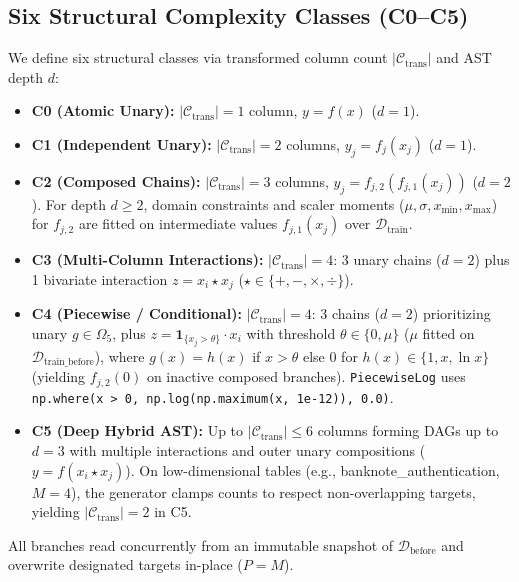 \documentclass[sigconf]{acmart}
\begin{document}
\subsection{Six Structural Complexity Classes (C0--C5)}
We define six structural classes via transformed column count $|\mathcal{C}_{\text{trans}}|$ and AST depth $d$:
\begin{itemize}
    \item \textbf{C0 (Atomic Unary):} $|\mathcal{C}_{\text{trans}}|=1$ column, $y=f(x)$ ($d=1$).
    \item \textbf{C1 (Independent Unary):} $|\mathcal{C}_{\text{trans}}|=2$ columns, $y_j=f_j(x_j)$ ($d=1$).
    \item \textbf{C2 (Composed Chains):} $|\mathcal{C}_{\text{trans}}|=3$ columns, $y_j=f_{j,2}(f_{j,1}(x_j))$ ($d=2$). For depth $d \ge 2$, domain constraints and scaler moments ($\mu,\sigma,x_{\min},x_{\max}$) for $f_{j,2}$ are fitted on intermediate values $f_{j,1}(x_j)$ over $\mathcal{D}_{\text{train}}$.
    \item \textbf{C3 (Multi-Column Interactions):} $|\mathcal{C}_{\text{trans}}|=4$: 3 unary chains ($d=2$) plus 1 bivariate interaction $z = x_i \star x_j$ ($\star \in \{+,-,\times,\div\}$).
    \item \textbf{C4 (Piecewise / Conditional):} $|\mathcal{C}_{\text{trans}}|=4$: 3 chains ($d=2$) prioritizing unary $g \in \Omega_5$, plus $z = \mathbf{1}_{\{x_j > \theta\}}\cdot x_i$ with threshold $\theta \in \{0, \mu\}$ ($\mu$ fitted on $\mathcal{D}_{\text{train\_before}}$), where $g(x) = h(x)$ if $x>\theta$ else $0$ for $h(x) \in \{1, x, \ln x\}$ (yielding $f_{j,2}(0)$ on inactive composed branches). \texttt{PiecewiseLog} uses \texttt{np.where(x > 0, np.log(np.maximum(x, 1e-12)), 0.0)}.
    \item \textbf{C5 (Deep Hybrid AST):} Up to $|\mathcal{C}_{\text{trans}}| \le 6$ columns forming DAGs up to $d=3$ with multiple interactions and outer unary compositions ($y=f(x_i \star x_j)$). On low-dimensional tables (e.g., \textsf{banknote\_authentication}, $M=4$), the generator clamps counts to respect non-overlapping targets, yielding $|\mathcal{C}_{\text{trans}}|=2$ in C5.
\end{itemize}
All branches read concurrently from an immutable snapshot of $\mathcal{D}_{\text{before}}$ and overwrite designated targets in-place ($P=M$).
\end{document}
